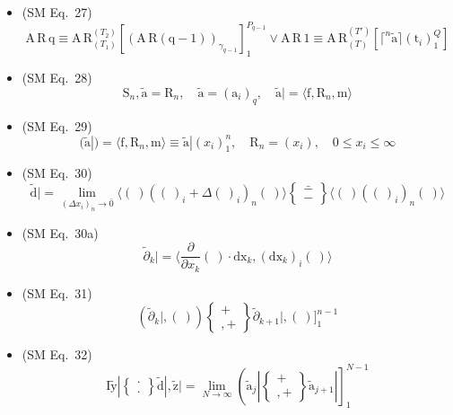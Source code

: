 \documentclass[
    12pt,              %
    a4paper,           %
    headings=normal,   %
    twoside=true,      %
    BCOR=8mm,          %
]{scrbook}
\begin{document}
\begin{itemize}[label={},leftmargin=0pt]
    \item (SM Eq.\ 27) 
    \[
    \mathrm{A}\,\mathrm{R}\,\mathrm{q} \equiv \mathrm{A}\,\mathrm{R}_{(T_1)}^{(T_2)} \left[ (\mathrm{A}\,\mathrm{R}(\mathrm{q}-1))_{\gamma_{q-1}} \right]_1^{P_{q-1}} \lor \mathrm{A}\,\mathrm{R}\,1 \equiv \mathrm{A}\,\mathrm{R}_{(T)}^{(T')} \left[ \lceil^n \tilde{\mathrm{a}} \rceil (\mathrm{t}_i)_1^Q \right]
    \]

    \item (SM Eq.\ 28) 
    \[
    \mathrm{S}_n, \tilde{\mathrm{a}} = \mathrm{R}_n, \quad \tilde{\mathrm{a}} = (\mathrm{a}_i)_q, \quad \tilde{\mathrm{a}}| = \langle \mathrm{f}, \mathrm{R}_n, \mathrm{m} \rangle
    \]

    \item (SM Eq.\ 29) 
    \[
    (\tilde{\mathrm{a}}|) = \langle \mathrm{f}, \mathrm{R}_n, \mathrm{m} \rangle \equiv \tilde{\mathrm{a}}| (x_i)_1^n, \quad \mathrm{R}_n = (x_i), \quad 0 \le x_i \le \infty
    \]

    \item (SM Eq.\ 30) 
    \[
    \tilde{\mathrm{d}}| = \lim_{(\Delta x_i)_n \to \bar{0}} \langle (\ ) \left( (\ )_i + \Delta (\ )_i \right)_n (\ ) \rangle \left\{ \begin{smallmatrix} \bar{-} \\ - \end{smallmatrix} \right\} \langle (\ ) \left( (\ )_i \right)_n (\ ) \rangle
    \]

    \item (SM Eq.\ 30a) 
    \[
    \tilde{\partial}_k| = \langle \frac{\partial}{\partial x_k} (\ ) \cdot \mathrm{dx}_k, (\mathrm{dx}_k)_i (\ ) \rangle
    \]

    \item (SM Eq.\ 31) 
    \[
    \left( \tilde{\partial}_k |, (\ ) \right) \left\{ \begin{smallmatrix} + \\ ,+ \end{smallmatrix} \right\} \tilde{\partial}_{k+1} |, (\ ) \bigr]_1^{n-1}
    \]

    \item (SM Eq.\ 32) 
    \[
    \mathrm{I} \tilde{\mathrm{y}}| \left\{ \begin{smallmatrix} \cdot \\ . \end{smallmatrix} \right\} \tilde{\mathrm{d}}|, \tilde{\mathrm{z}}| = \lim_{N \to \infty} \left( \tilde{\mathrm{a}}_j| \left\{ \begin{smallmatrix} + \\ ,+ \end{smallmatrix} \right\} \tilde{\mathrm{a}}_{j+1}| \right]_1^{N-1}
    \]


\end{itemize}
\end{document}
